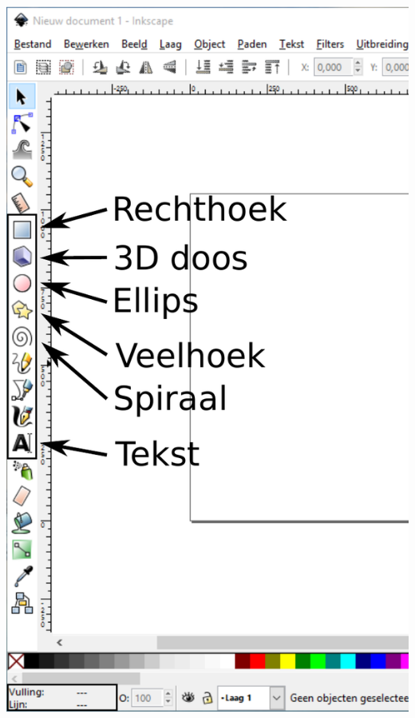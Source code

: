 \documentclass[t]{beamer}
\begin{document}
\begin{frame}
\begin{columns}
\begin{column}[T]{0.4\textwidth}
				\includegraphics[height=0.8\textheight]{fig/inkscape_objecten}
			\end{column}
		\end{columns}
	\end{frame}
\end{document}
